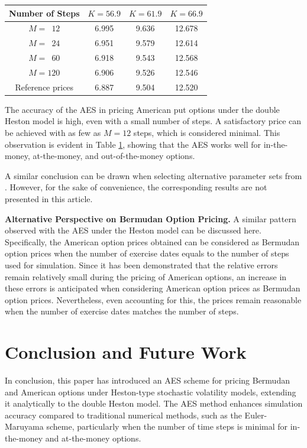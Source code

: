 \documentclass[]{interact}
\theoremstyle{plain}%
\theoremstyle{definition}
\theoremstyle{remark}
\begin{document}
\begin{table}
{\begin{tabular}{cccc} 
\toprule
Number of Steps & $K=56.9$ & $K=61.9$ & $K=66.9$ \\ 
\midrule
$M=\phantom{1}12$   & 6.995 & 9.636 & 12.678 \\
$M=\phantom{1}24$   & 6.951 & 9.579 & 12.614 \\
$M=\phantom{1}60$   & 6.918 & 9.543 & 12.568 \\
$M=120$             & 6.906 & 9.526 & 12.546 \\
\midrule
Reference prices   & 6.887 & 9.504 & 12.520 \\
\bottomrule
\end{tabular}}
\label{table:DoubleHestonAmericanBermudan}
\end{table}


The accuracy of the AES in pricing American put options under the double Heston model is high, even with a small number of steps. A satisfactory price can be achieved with as few as $M=12$ steps, which is considered minimal. This observation is evident in Table \ref{table:DoubleHestonAmericanBermudan}, showing that the AES works well for in-the-money, at-the-money, and out-of-the-money options. 

A similar conclusion can be drawn when selecting alternative parameter sets from \cite{zhang2019american}. However, for the sake of convenience, the corresponding results are not presented in this article.

\textbf{Alternative Perspective on Bermudan Option Pricing.} A similar pattern observed with the AES under the Heston model can be discussed here. Specifically, the American option prices obtained can be considered as Bermudan option prices when the number of exercise dates equals to the number of steps used for simulation. Since it has been demonstrated that the relative errors remain relatively small during the pricing of American options, an increase in these errors is anticipated when considering American option prices as Bermudan option prices. Nevertheless, even accounting for this, the prices remain reasonable when the number of exercise dates matches the number of steps.






\section{Conclusion and Future Work}\label{Sec:Conclusion}
In conclusion, this paper has introduced an AES scheme for pricing Bermudan and American options under Heston-type stochastic volatility models, extending it analytically to the double Heston model. The AES method enhances simulation accuracy compared to traditional numerical methods, such as the Euler-Maruyama scheme, particularly when the number of time steps is minimal for in-the-money and at-the-money options.
\end{document}
